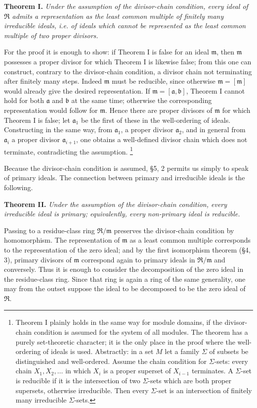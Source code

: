 \documentclass[11pt]{article}
\providecommand{\mR}{\mathfrak{R}}
\providecommand{\ma}{\mathfrak{a}}
\providecommand{\mb}{\mathfrak{b}}
\providecommand{\mm}{\mathfrak{m}}
\begin{document}
\textbf{Theorem I.} \emph{Under the assumption of the divisor-chain condition, every ideal of $\mR$ admits a representation as the least common multiple of finitely many irreducible ideals, i.e. of ideals which cannot be represented as the least common multiple of two proper divisors.}

For the proof it is enough to show: if Theorem I is false for an ideal $\mm$, then $\mm$ possesses a proper divisor for which Theorem I is likewise false; from this one can construct, contrary to the divisor-chain condition, a divisor chain not terminating after finitely many steps. Indeed $\mm$ must be reducible, since otherwise $\mm=[\mm]$ would already give the desired representation. If $\mm=[\ma,\mb]$, Theorem I cannot hold for both $\ma$ and $\mb$ at the same time; otherwise the corresponding representation would follow for $\mm$. Hence there are proper divisors of $\mm$ for which Theorem I is false; let $\ma_1$ be the first of these in the well-ordering of ideals. Constructing in the same way, from $\ma_1$, a proper divisor $\ma_2$, and in general from $\ma_i$ a proper divisor $\ma_{i+1}$, one obtains a well-defined divisor chain which does not terminate, contradicting the assumption.
\footnote{Theorem I plainly holds in the same way for module domains, if the divisor-chain condition is assumed for the system of all modules. The theorem has a purely set-theoretic character; it is the only place in the proof where the well-ordering of ideals is used. Abstractly: in a set $M$ let a family $\Sigma$ of subsets be distinguished and well-ordered. Assume the chain condition for $\Sigma$-sets: every chain $X_1,X_2,\ldots$ in which $X_i$ is a proper superset of $X_{i-1}$ terminates. A $\Sigma$-set is reducible if it is the intersection of two $\Sigma$-sets which are both proper supersets, otherwise irreducible. Then every $\Sigma$-set is an intersection of finitely many irreducible $\Sigma$-sets.}

Because the divisor-chain condition is assumed, §5, 2 permits us simply to speak of primary ideals. The connection between primary and irreducible ideals is the following.

\textbf{Theorem II.} \emph{Under the assumption of the divisor-chain condition, every irreducible ideal is primary; equivalently, every non-primary ideal is reducible.}

Passing to a residue-class ring $\mR/\mm$ preserves the divisor-chain condition by homomorphism. The representation of $\mm$ as a least common multiple corresponds to the representation of the zero ideal; and by the first isomorphism theorem (§4, 3), primary divisors of $\mm$ correspond again to primary ideals in $\mR/\mm$ and conversely. Thus it is enough to consider the decomposition of the zero ideal in the residue-class ring. Since that ring is again a ring of the same generality, one may from the outset suppose the ideal to be decomposed to be the zero ideal of $\mR$.
\end{document}
